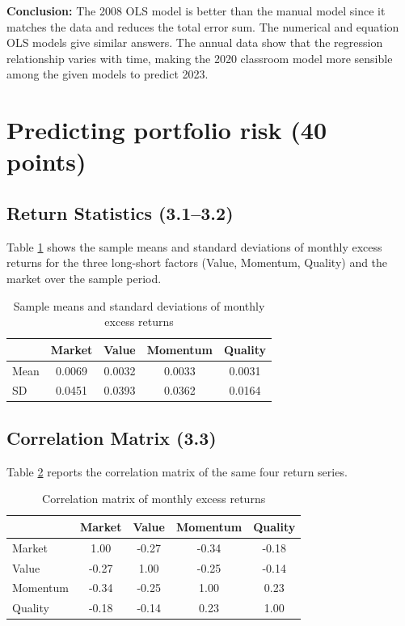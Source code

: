 \documentclass[11pt]{article}
\begin{document}
\vspace{1em}
\noindent\textbf{Conclusion:} The 2008 OLS model is better than the manual model since it matches the data and reduces the total error sum. The numerical and equation OLS models give similar answers. The annual data show that the regression relationship varies with time, making the 2020 classroom model more sensible among the given models to predict 2023.

\section{Predicting portfolio risk (40 points)}

\subsection{Return Statistics (3.1--3.2)}

Table \ref{tab:returnstats} shows the sample means and standard deviations of monthly excess returns for the three long-short factors (Value, Momentum, Quality) and the market over the sample period.

\begin{table}[h]
\centering
\caption{Sample means and standard deviations of monthly excess returns}
\label{tab:returnstats}
\begin{tabular}{lcccc}
\toprule
 & Market & Value & Momentum & Quality \\
\midrule
Mean & 0.0069 & 0.0032 & 0.0033 & 0.0031 \\
SD & 0.0451 & 0.0393 & 0.0362 & 0.0164 \\
\bottomrule
\end{tabular}
\end{table}

\subsection{Correlation Matrix (3.3)}

Table \ref{tab:corrmatrix} reports the correlation matrix of the same four return series.

\begin{table}[h]
\centering
\caption{Correlation matrix of monthly excess returns}
\label{tab:corrmatrix}
\begin{tabular}{lcccc}
\toprule
 & Market & Value & Momentum & Quality \\
\midrule
Market & 1.00 & -0.27 & -0.34 & -0.18 \\
Value & -0.27 & 1.00 & -0.25 & -0.14 \\
Momentum & -0.34 & -0.25 & 1.00 & 0.23 \\
Quality & -0.18 & -0.14 & 0.23 & 1.00 \\
\bottomrule
\end{tabular}
\end{table}
\end{document}
